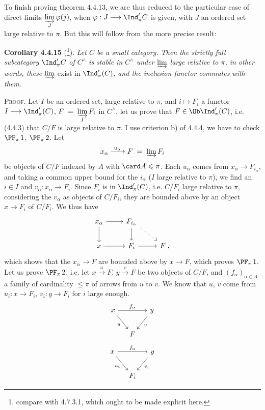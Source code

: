 To finish proving theorem 4.4.13, we are thus reduced to the particular case of direct limits $\varinjlim\limits_{J}\varphi(j)$, when $\varphi:J\longrightarrow\Ind'_\pi C$ is given, with $J$ an
ordered set large relative to $\pi$. But this will follow from the more precise result:

\textbf{Corollary 4.4.15} (\footnote{compare with 4.7.3.1, which ought to be made explicit here.}). \textit{Let $C$ be a small category. Then the strictly full subcategory} $\Ind'_\pi C$ \textit{of $C^\wedge$ is stable in $C^\wedge$ under $\varinjlim$ large relative to $\pi$, in other words, these $\varinjlim$} exist in $\Ind'_\pi(C)$, \textit{and the inclusion functor commutes with them.} %

\textsc{Proof}. Let $I$ be an ordered set, large relative to $\pi$, and $i\longmapsto F_i$ a functor $I\longrightarrow\Ind'_\pi(C)$, $F\;=\;\varinjlim\limits_{I}F_i$ in $C^\wedge$, let us prove that $F\in\Ob\Ind'_\pi(C)$, i.e. (4.4.3) that $C/F$ is large relative to $\pi$. I use criterion b) of 4.4.4, we have to check $\PF_\pi\,1$, $\PF_\pi\,2$. Let
\[
x_\alpha\xrightarrow{\;u_\alpha\;}F\;=\;\varinjlim F_i
\]
be objects of $C/F$ indexed by $A$ with $\card A\leqslant\pi$. Each $u_\alpha$ comes from $x_\alpha\longrightarrow F_{i_\alpha}$, and taking a common upper bound for the $i_\alpha$ ($I$ large relative to $\pi$), we find an $i\in I$ and $v_\alpha:x_\alpha\longrightarrow F_i$. Since $F_i$ is in $\Ind'_\pi(C)$, i.e. $C/F_i$ large relative to $\pi$, considering the $v_\alpha$ as objects of $C/F_i$, they are bounded above by an object $x\longrightarrow F_i$ of $C/F_i$. We thus have
\[
\begin{tikzcd}
x_\alpha \arrow[r] \arrow[d] & F_{i_\alpha} \arrow[d] \arrow[dr, dotted] & \\
x \arrow[r] & F_i \arrow[r] & F\;,
\end{tikzcd}
\]
which shows that the $x_\alpha\longrightarrow F$ are bounded above by $x\longrightarrow F$,
which proves $\PF_\pi\,1$. Let us prove $\PF_\pi\,2$, i.e. let $x\xrightarrow{\;u\;}F$, $y\xrightarrow{\;v\;}F$ be two objects of $C/F$, and $(f_\alpha)_{\alpha\in A}$ a family of cardinality $\leqslant\pi$ of arrows from $u$ to $v$. We know that $u$, $v$ come from $u_i:x\longrightarrow F_i$, $v_i:y\longrightarrow F_i$ for $i$ large enough.
\[
\begin{tikzcd}[column sep=small]
x \arrow[rr, "f_\alpha"] \arrow[dr, "u"'] & & y \arrow[dl, "v"] \\
& F &
\end{tikzcd}
\]
\[
\begin{tikzcd}[column sep=small]
x \arrow[rr, "f_\alpha"] \arrow[dr, "u_i"'] & & y \arrow[dl, "v_i"] \\
& F_i &
\end{tikzcd}
\]

